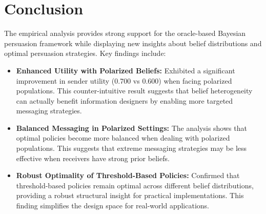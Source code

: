 \documentclass[12pt]{article}
\theoremstyle{plain}
\theoremstyle{definition}
\theoremstyle{remark}
\begin{document}
\section{Conclusion}

The empirical analysis provides strong support for the oracle-based Bayesian persuasion framework while displaying new insights about belief distributions and optimal persuasion strategies. Key findings include:

\begin{itemize}
    \item \textbf{Enhanced Utility with Polarized Beliefs:} Exhibited a significant improvement in sender utility (0.700 vs 0.600) when facing polarized populations. This counter-intuitive result suggests that belief heterogeneity can actually benefit information designers by enabling more targeted messaging strategies.
    
    \item \textbf{Balanced Messaging in Polarized Settings:} The analysis shows that optimal policies become more balanced when dealing with polarized populations. This suggests that extreme messaging strategies may be less effective when receivers have strong prior beliefs.
    
    \item \textbf{Robust Optimality of Threshold-Based Policies:} Confirmed that threshold-based policies remain optimal across different belief distributions, providing a robust structural insight for practical implementations. This finding simplifies the design space for real-world applications.
\end{itemize}
\end{document}

